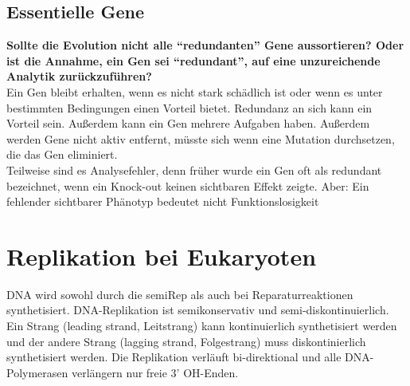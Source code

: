 \subsection{Essentielle Gene}\label{subsec:essentielle-gene}




\begin{fr}
    \textbf{Sollte die Evolution nicht alle ``redundanten'' Gene aussortieren? Oder ist
    die Annahme, ein Gen sei ``redundant'', auf eine unzureichende Analytik
    zurückzuführen?} \\
    Ein Gen bleibt erhalten, wenn es nicht stark schädlich ist oder wenn es unter bestimmten Bedingungen einen
    Vorteil bietet.
    Redundanz an sich kann ein Vorteil sein.
    Außerdem kann ein Gen mehrere Aufgaben haben.
    Außerdem werden Gene nicht aktiv entfernt, müsste sich wenn eine Mutation durchsetzen, die das Gen eliminiert. \\
    Teilweise sind es Analysefehler, denn früher wurde ein Gen oft als redundant bezeichnet, wenn ein Knock-out
    keinen sichtbaren Effekt zeigte.
    Aber: Ein fehlender sichtbarer Phänotyp bedeutet nicht Funktionslosigkeit
\end{fr}



\section{Replikation bei Eukaryoten}\label{sec:replikation}
DNA wird sowohl durch die \gls{semiRep}
als auch bei Reparaturreaktionen synthetisiert.
DNA-Replikation ist semikonservativ und semi-diskontinuierlich.
Ein Strang (leading strand, Leitstrang) kann
kontinuierlich synthetisiert werden und der andere Strang (lagging strand, Folgestrang) muss
diskontinierlich synthetisiert werden.
Die Replikation verläuft bi-direktional und alle DNA-Polymerasen verlängern nur freie 3' OH-Enden. \cite{vorlesung3}


